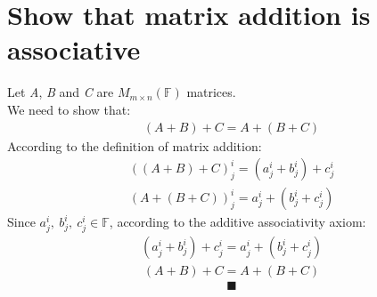 \documentclass[a4paper, 12pt]{article}
\newcommand{\?}{\stackrel{?}{=}}
\newcommand{\F}{\ensuremath{\mathbb{F}}}
\newcommand{\eq}[1]{\begin{align*}#1\end{align*}}
\renewcommand{\qed}{$$\blacksquare$$}
\begin{document}
\setcounter{section}{20}
\section{Show that matrix addition is associative}
Let \textit{A}, \textit{B} and \textit{C} are $M_{m\times{n}}(\F)$ matrices.\\
We need to show that:\eq{(A+B)+C=A+(B+C)}
According to the definition of matrix addition:
\eq{((A+B)+C)^{i}_{j}=(a^{i}_{j}+b^{i}_{j})+c^{i}_{j}}
\eq{(A+(B+C))^{i}_{j}=a^{i}_{j}+(b^{i}_{j}+c^{i}_{j})}
Since $a^{i}_{j},~b^{i}_{j},~c^{i}_{j}\in\F$, according to the additive associativity axiom:
\eq{(a^{i}_{j}+b^{i}_{j})+c^{i}_{j}=a^{i}_{j}+(b^{i}_{j}+c^{i}_{j})}
\eq{(A+B)+C=A+(B+C)}
\qed

\end{document}
